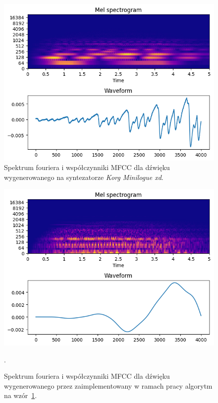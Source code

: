 \begin{multicols}{2}
\begin{figure}[H]
    \centering
    \includegraphics[width=1.0\linewidth]{rys06/target_minilogue.png}
    \caption{
      Spektrum fouriera i współczynniki MFCC dla dźwięku wygenerowanego 
      na syntezatorze \textit{Korg Minilogue xd}.
    }\label{fig:minilogue_target_sample}
\end{figure}

\begin{figure}[H]
    \centering
    \includegraphics[width=1.0\linewidth]{rys06/evolved_minilogue.png}
    \caption{
      Spektrum fouriera i współczynniki MFCC dla dźwięku wygenerowanego 
      przez zaimplementowany w ramach pracy algorytm na
      wzór~\ref{fig:minilogue_target_sample}.
    }\label{fig:evolved_minilogue_sample}.
\end{figure}
\end{multicols}


